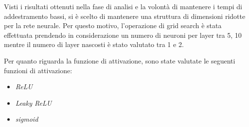 Visti i risultati ottenuti nella fase di analisi e la volontà di mantenere i
tempi di addestramento bassi, si è scelto di mantenere una struttura di dimensioni
ridotte per la rete neurale. Per questo motivo, l'operazione di grid search è
stata effettuata prendendo in considerazione un numero di neuroni per layer
tra 5, 10 mentre il numero di layer nascosti è stato valutato tra 1 e 2.

Per quanto riguarda la funzione di attivazione, sono state valutate le seguenti
funzioni di attivazione:
\begin{itemize}
    \item \textit{ReLU}
    \item \textit{Leaky ReLU}
    \item \textit{sigmoid}
\end{itemize}

